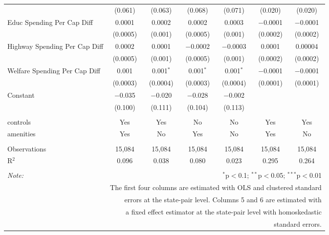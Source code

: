 \begin{table}[!htbp]
\begin{tabular}{@{\extracolsep{5pt}}lcccccc}
  & (0.061) & (0.063) & (0.068) & (0.071) & (0.020) & (0.020) \\ 
  Educ Spending Per Cap Diff & 0.0001 & 0.0002 & 0.0002 & 0.0003 & $-$0.0001 & $-$0.0001 \\ 
  & (0.0005) & (0.001) & (0.0005) & (0.001) & (0.0002) & (0.0002) \\ 
  Highway Spending Per Cap Diff & 0.0002 & 0.0001 & $-$0.0002 & $-$0.0003 & 0.0001 & 0.00004 \\ 
  & (0.0005) & (0.001) & (0.0005) & (0.001) & (0.0002) & (0.0002) \\ 
  Welfare Spending Per Cap Diff & 0.001 & 0.001$^{*}$ & 0.001$^{*}$ & 0.001$^{*}$ & $-$0.0001 & $-$0.0001 \\ 
  & (0.0003) & (0.0004) & (0.0003) & (0.0004) & (0.0001) & (0.0001) \\ 
  Constant & $-$0.035 & $-$0.020 & $-$0.028 & $-$0.002 &  &  \\ 
  & (0.100) & (0.111) & (0.104) & (0.113) &  &  \\ 
 \hline \\[-1.8ex] 
controls & Yes & Yes & No & No & Yes & Yes \\ 
amenities & Yes & No & Yes & No & Yes & No \\ 
\hline \\[-1.8ex] 
Observations & 15,084 & 15,084 & 15,084 & 15,084 & 15,084 & 15,084 \\ 
R$^{2}$ & 0.096 & 0.038 & 0.080 & 0.023 & 0.295 & 0.264 \\ 
\hline 
\hline \\[-1.8ex] 
\textit{Note:}  & \multicolumn{6}{r}{$^{*}$p$<$0.1; $^{**}$p$<$0.05; $^{***}$p$<$0.01} \\ 
 & \multicolumn{6}{r}{The first four columns are estimated with OLS and clustered standard} \\ 
 & \multicolumn{6}{r}{ errors at the state-pair level. Columns 5 and 6 are estimated with} \\ 
 & \multicolumn{6}{r}{a fixed effect estimator at the state-pair level with homoskedastic} \\ 
 & \multicolumn{6}{r}{standard errors.} \\ 
\end{tabular} 
\end{table} 
